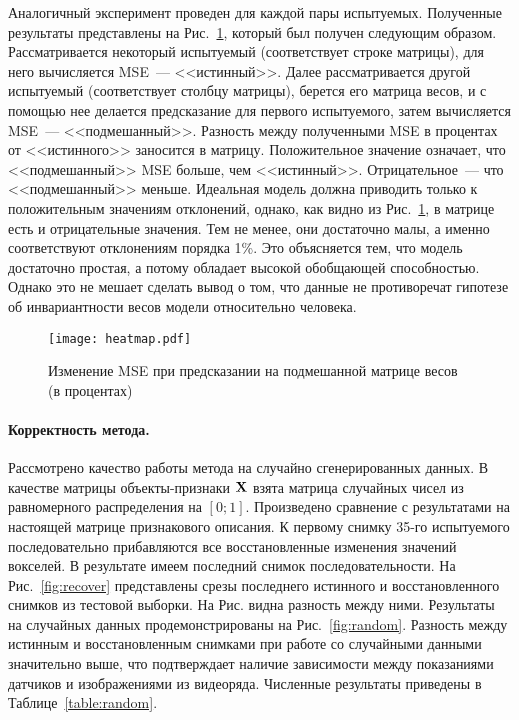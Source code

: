 \documentclass[a4paper, 12pt]{extarticle}
\begin{document}
Аналогичный эксперимент проведен для каждой пары испытуемых.
Полученные результаты представлены на Рис.~\ref{fig:heatmap},
который был получен следующим образом.
Рассматривается некоторый испытуемый (соответствует строке матрицы), 
для него вычисляется MSE~--- <<истинный>>.
Далее рассматривается другой испытуемый (соответствует столбцу матрицы),
берется его матрица весов, и с помощью нее делается предсказание для первого 
испытуемого, затем вычисляется MSE~--- <<подмешанный>>. 
Разность между полученными MSE в процентах от <<истинного>> заносится в матрицу.
Положительное значение означает, что <<подмешанный>> MSE больше, чем <<истинный>>.
Отрицательное~--- что <<подмешанный>> меньше.
Идеальная модель должна приводить только к положительным значениям отклонений, однако,
как видно из Рис.~\ref{fig:heatmap}, в матрице есть и отрицательные значения.
Тем не менее, они достаточно малы, а именно соответствуют отклонениям порядка 1\%.
Это объясняется тем, что модель достаточно простая, а потому обладает
высокой обобщающей способностью.
Однако это не мешает сделать вывод о том, что данные не противоречат гипотезе 
об инвариантности весов модели относительно человека.

\begin{figure}[h!]
	\centering
	\texttt{[image: heatmap.pdf]}
	\caption{Изменение MSE при предсказании на подмешанной матрице весов (в процентах)}
	\label{fig:heatmap}
\end{figure}

\paragraph*{Корректность метода.}

Рассмотрено качество работы метода на случайно сгенерированных данных. 
В качестве матрицы объекты-признаки $\mathbf{X}$ взята матрица 
случайных чисел из равномерного распределения на $[0; 1]$.
Произведено сравнение с результатами на настоящей матрице признакового описания.
К первому снимку 35-го испытуемого последовательно прибавляются все восстановленные
изменения значений вокселей.
В результате имеем последний снимок последовательности. На Рис.~\ref*{fig:recover}
представлены срезы последнего истинного и восстановленного снимков из тестовой выборки.
На Рис. видна разность между ними.
Результаты на случайных данных продемонстрированы на Рис.~\ref*{fig:random}.
Разность между истинным и восстановленным снимками при работе со случайными данными
значительно выше, что подтверждает наличие зависимости между показаниями датчиков и
изображениями из видеоряда. Численные результаты приведены в Таблице~\ref{table:random}.
\end{document}

